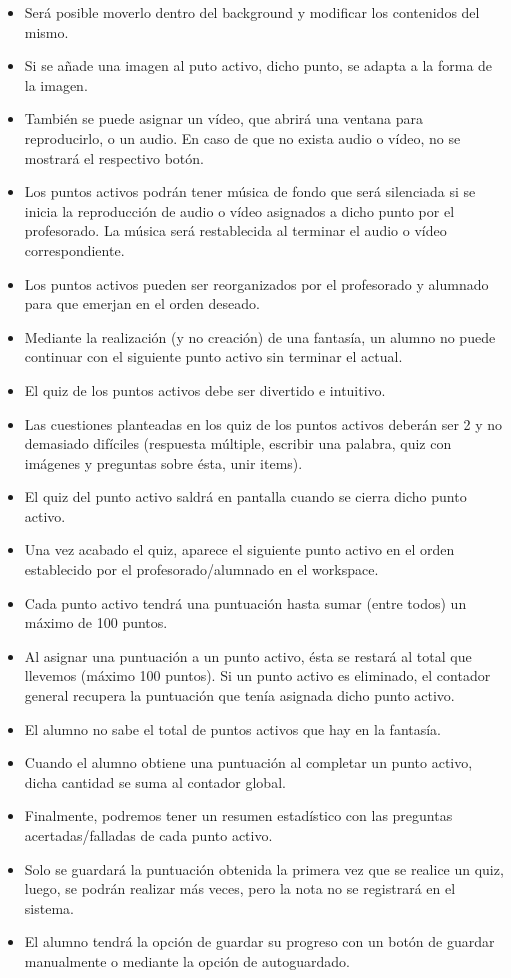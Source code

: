 \documentclass[12pt,letterpaper]{article}
\begin{document}
\begin{itemize}
	\item Será posible moverlo dentro del background y modificar los contenidos del mismo.
	\item Si se añade una imagen al puto activo, dicho punto, se adapta a la forma de la imagen.
	\item También se puede asignar un vídeo, que abrirá una ventana para reproducirlo, o un audio. En caso de que no exista audio o vídeo, no se mostrará el respectivo botón.
	\item Los puntos activos podrán tener música de fondo que será silenciada si se inicia la reproducción de audio o vídeo asignados a dicho punto por el profesorado. La música será restablecida al terminar el audio o vídeo correspondiente.
	\item Los puntos activos pueden ser reorganizados por el profesorado y alumnado para que emerjan en el orden deseado.
	\item Mediante la realización (y no creación) de una fantasía, un alumno no puede continuar con el siguiente punto activo sin terminar el actual.
	\item El quiz de los puntos activos debe ser divertido e intuitivo.
	\item Las cuestiones planteadas en los quiz de los puntos activos deberán ser 2 y no demasiado difíciles (respuesta múltiple, escribir una palabra, quiz con imágenes y preguntas sobre ésta, unir items).
	\item El quiz del punto activo saldrá en pantalla cuando se cierra dicho punto activo.
	\item Una vez acabado el quiz, aparece el siguiente punto activo en el orden establecido por el profesorado/alumnado en el workspace.
	\item Cada punto activo tendrá una puntuación hasta sumar (entre todos) un máximo de 100 puntos.
	\item Al asignar una puntuación a un punto activo, ésta se restará al total que llevemos (máximo 100 puntos). Si un punto activo es eliminado, el contador general recupera la puntuación que tenía asignada dicho punto activo.
	\item El alumno no sabe el total de puntos activos que hay en la fantasía.
	\item Cuando el alumno obtiene una puntuación al completar un punto activo, dicha cantidad se suma al contador global.
	\item Finalmente, podremos tener un resumen estadístico con las preguntas acertadas/falladas de cada punto activo.
	\item Solo se guardará la puntuación obtenida la primera vez que se realice un quiz, luego, se podrán realizar más veces, pero la nota no se registrará en el sistema.
	\item El alumno tendrá la opción de guardar su progreso con un botón de guardar manualmente o mediante la opción de autoguardado.
\end{itemize}
\end{document}
